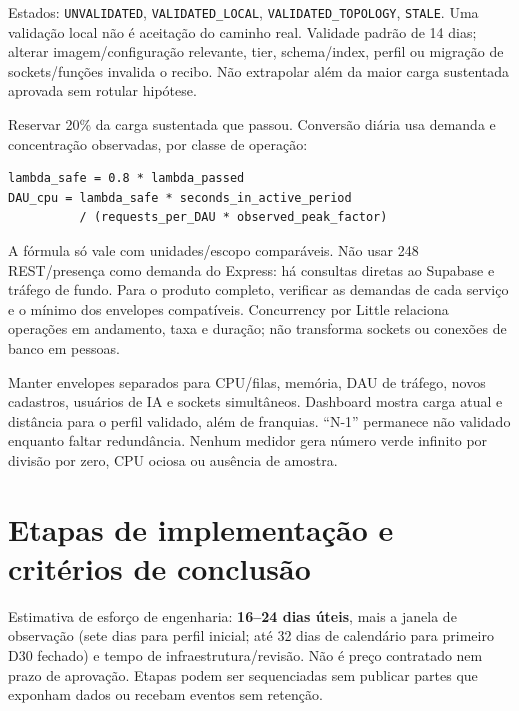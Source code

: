 \documentclass[10pt,a4paper]{article}
\begin{document}
Estados: {\footnotesize\ttfamily\nolinkurl{UNVALIDATED}}, {\footnotesize\ttfamily\nolinkurl{VALIDATED_LOCAL}},
{\footnotesize\ttfamily\nolinkurl{VALIDATED_TOPOLOGY}}, {\footnotesize\ttfamily\nolinkurl{STALE}}. Uma validação local não é
aceitação do caminho real. Validade padrão de 14 dias; alterar
imagem/configuração relevante, tier, schema/index, perfil ou migração de
sockets/funções invalida o recibo. Não extrapolar além da maior carga
sustentada aprovada sem rotular hipótese.

Reservar 20\% da carga sustentada que passou. Conversão diária usa
demanda e concentração observadas, por classe de operação:

\begin{verbatim}
lambda_safe = 0.8 * lambda_passed
DAU_cpu = lambda_safe * seconds_in_active_period
          / (requests_per_DAU * observed_peak_factor)
\end{verbatim}

A fórmula só vale com unidades/escopo comparáveis. Não usar 248
REST/presença como demanda do Express: há consultas diretas ao Supabase
e tráfego de fundo. Para o produto completo, verificar as demandas de
cada serviço e o mínimo dos envelopes compatíveis. Concurrency por
Little relaciona operações em andamento, taxa e duração; não transforma
sockets ou conexões de banco em pessoas.

Manter envelopes separados para CPU/filas, memória, DAU de tráfego,
novos cadastros, usuários de IA e sockets simultâneos. Dashboard mostra
carga atual e distância para o perfil validado, além de franquias.
``N-1'' permanece não validado enquanto faltar redundância. Nenhum
medidor gera número verde infinito por divisão por zero, CPU ociosa ou
ausência de amostra.

\clearpage
\section{Etapas de implementação e critérios de
conclusão}\label{etapas-de-implementauxe7uxe3o-e-crituxe9rios-de-conclusuxe3o}

Estimativa de esforço de engenharia: \textbf{16--24 dias úteis}, mais a
janela de observação (sete dias para perfil inicial; até 32 dias de
calendário para primeiro D30 fechado) e tempo de infraestrutura/revisão.
Não é preço contratado nem prazo de aprovação. Etapas podem ser
sequenciadas sem publicar partes que exponham dados ou recebam eventos
sem retenção.
\end{document}
